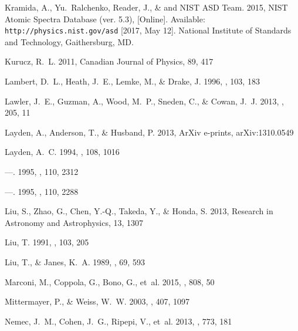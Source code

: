 \documentclass[preprint]{aastex6}
\begin{document}
\begin{thebibliography}{}
Kramida, A., {Yu.~Ralchenko}, Reader, J., \& {and NIST ASD Team}. 2015, {NIST
  Atomic Spectra Database (ver. 5.3), [Online]. Available:
  {\tt{http://physics.nist.gov/asd}} [2017, May 12]. National Institute of
  Standards and Technology, Gaithersburg, MD.}

{Kurucz}, R.~L. 2011, Canadian Journal of Physics, 89, 417

{Lambert}, D.~L., {Heath}, J.~E., {Lemke}, M., \& {Drake}, J. 1996, \apjs, 103,
  183

{Lawler}, J.~E., {Guzman}, A., {Wood}, M.~P., {Sneden}, C., \& {Cowan}, J.~J.
  2013, \apjs, 205, 11

{Layden}, A., {Anderson}, T., \& {Husband}, P. 2013, ArXiv e-prints,
  arXiv:1310.0549

{Layden}, A.~C. 1994, \aj, 108, 1016

---. 1995{}, \aj, 110, 2312

---. 1995{}, \aj, 110, 2288

{Liu}, S., {Zhao}, G., {Chen}, Y.-Q., {Takeda}, Y., \& {Honda}, S. 2013,
  Research in Astronomy and Astrophysics, 13, 1307

{Liu}, T. 1991, \pasp, 103, 205

{Liu}, T., \& {Janes}, K.~A. 1989, \apjs, 69, 593

{Marconi}, M., {Coppola}, G., {Bono}, G., {et~al.} 2015, \apj, 808, 50

{Mittermayer}, P., \& {Weiss}, W.~W. 2003, \aap, 407, 1097

{Nemec}, J.~M., {Cohen}, J.~G., {Ripepi}, V., {et~al.} 2013, \apj, 773, 181


\end{thebibliography}
\end{document}
